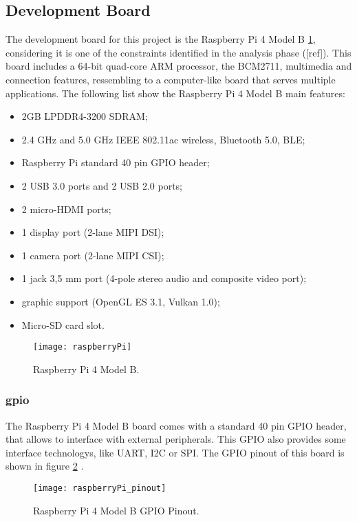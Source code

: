 \subsection{Development Board}

The development board for this project is the Raspberry Pi 4 Model B \ref{fig:rasp}, considering it is one of the constraints identified in the analysis phase ([ref]). This board includes a 64-bit quad-core ARM processor, the BCM2711, multimedia and connection features, ressembling to a computer-like board that serves multiple applications. The following list show the Raspberry Pi 4 Model B main features:

\begin{itemize}
        \item 2GB LPDDR4-3200 SDRAM;
        \item 2.4 GHz and 5.0 GHz IEEE 802.11ac wireless, Bluetooth 5.0, BLE;
        \item Raspberry Pi standard 40 pin GPIO header;   
        \item 2 USB 3.0 ports and 2 USB 2.0 ports;
        \item 2 micro-HDMI ports;
        \item 1 display port (2-lane MIPI DSI);
        \item 1 camera port (2-lane MIPI CSI);
        \item 1 jack 3,5 mm port (4-pole stereo audio and composite video port);
		\item graphic support (OpenGL ES 3.1, Vulkan 1.0);
		\item Micro-SD card slot.
\end{itemize}


\begin{figure}[ht]
	\centering
	\texttt{[image: raspberryPi]}
	\caption{Raspberry Pi 4 Model B.}
	\label{fig:rasp}
\end{figure}

\subsubsection{\ac{gpio}}

The Raspberry Pi 4 Model B board comes with a standard 40 pin GPIO header, that allows to interface with external peripherals. This GPIO also provides some interface technologys, like UART, I2C or SPI. The GPIO pinout of this board is shown in figure \ref{fig:rasp_pinout} \cite{pinout}.

\begin{figure}[ht]
	\centering
	\texttt{[image: raspberryPi\_pinout]}
	\caption{Raspberry Pi 4 Model B GPIO Pinout.}
	\label{fig:rasp_pinout}
\end{figure}